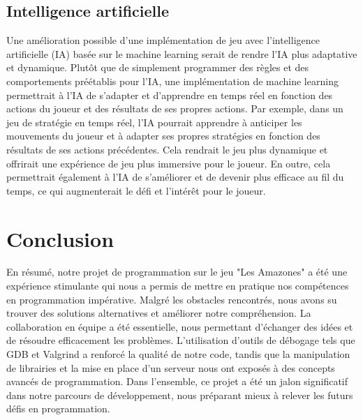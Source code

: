 \documentclass[11pt]{article}
\begin{document}
\subsection{Intelligence artificielle}

Une amélioration possible d'une implémentation de jeu avec l'intelligence artificielle (IA) basée sur le machine learning serait de rendre l'IA plus adaptative et dynamique. Plutôt que de simplement programmer des règles et des comportements préétablis pour l'IA, une implémentation de machine learning permettrait à l'IA de s'adapter et d'apprendre en temps réel en fonction des actions du joueur et des résultats de ses propres actions. Par exemple, dans un jeu de stratégie en temps réel, l'IA pourrait apprendre à anticiper les mouvements du joueur et à adapter ses propres stratégies en fonction des résultats de ses actions précédentes. Cela rendrait le jeu plus dynamique et offrirait une expérience de jeu plus immersive pour le joueur. En outre, cela permettrait également à l'IA de s'améliorer et de devenir plus efficace au fil du temps, ce qui augmenterait le défi et l'intérêt pour le joueur.

    \section{Conclusion}
En résumé, notre projet de programmation sur le jeu "Les Amazones" a été une expérience stimulante qui nous a permis de mettre en pratique nos compétences en programmation impérative. Malgré les obstacles rencontrés, nous avons su trouver des solutions alternatives et améliorer notre compréhension. La collaboration en équipe a été essentielle, nous permettant d'échanger des idées et de résoudre efficacement les problèmes. L'utilisation d'outils de débogage tels que GDB et Valgrind a renforcé la qualité de notre code, tandis que la manipulation de librairies et la mise en place d'un serveur nous ont exposés à des concepts avancés de programmation. Dans l'ensemble, ce projet a été un jalon significatif dans notre parcours de développement, nous préparant mieux à relever les futurs défis en programmation.
\end{document}
